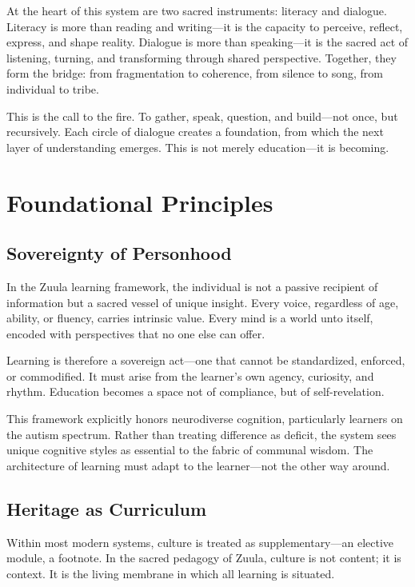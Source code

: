 \documentclass[12pt]{article}
\begin{document}
At the heart of this system are two sacred instruments: literacy and dialogue. Literacy is more than reading and writing—it is the capacity to perceive, reflect, express, and shape reality. Dialogue is more than speaking—it is the sacred act of listening, turning, and transforming through shared perspective. Together, they form the bridge: from fragmentation to coherence, from silence to song, from individual to tribe.

This is the call to the fire. To gather, speak, question, and build—not once, but recursively. Each circle of dialogue creates a foundation, from which the next layer of understanding emerges. This is not merely education—it is becoming.

\section*{Foundational Principles}

\subsection*{Sovereignty of Personhood}

In the Zuula learning framework, the individual is not a passive recipient of information but a sacred vessel of unique insight. Every voice, regardless of age, ability, or fluency, carries intrinsic value. Every mind is a world unto itself, encoded with perspectives that no one else can offer.

Learning is therefore a sovereign act—one that cannot be standardized, enforced, or commodified. It must arise from the learner’s own agency, curiosity, and rhythm. Education becomes a space not of compliance, but of self-revelation.

This framework explicitly honors neurodiverse cognition, particularly learners on the autism spectrum. Rather than treating difference as deficit, the system sees unique cognitive styles as essential to the fabric of communal wisdom. The architecture of learning must adapt to the learner—not the other way around.

\subsection*{Heritage as Curriculum}

Within most modern systems, culture is treated as supplementary—an elective module, a footnote. In the sacred pedagogy of Zuula, culture is not content; it is context. It is the living membrane in which all learning is situated.
\end{document}
